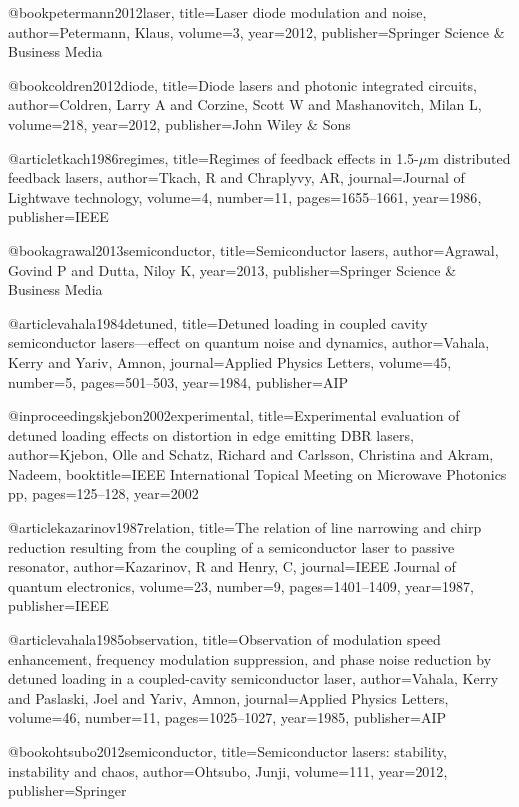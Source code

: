 @book{petermann2012laser,
  title={Laser diode modulation and noise},
  author={Petermann, Klaus},
  volume={3},
  year={2012},
  publisher={Springer Science \& Business Media}
}

@book{coldren2012diode,
  title={Diode lasers and photonic integrated circuits},
  author={Coldren, Larry A and Corzine, Scott W and Mashanovitch, Milan L},
  volume={218},
  year={2012},
  publisher={John Wiley \& Sons}
}

@article{tkach1986regimes,
  title={Regimes of feedback effects in 1.5-$\mu$m distributed feedback lasers},
  author={Tkach, R and Chraplyvy, AR},
  journal={Journal of Lightwave technology},
  volume={4},
  number={11},
  pages={1655--1661},
  year={1986},
  publisher={IEEE}
}


@book{agrawal2013semiconductor,
  title={Semiconductor lasers},
  author={Agrawal, Govind P and Dutta, Niloy K},
  year={2013},
  publisher={Springer Science \& Business Media}
}

@article{vahala1984detuned,
  title={Detuned loading in coupled cavity semiconductor lasers—effect on quantum noise and dynamics},
  author={Vahala, Kerry and Yariv, Amnon},
  journal={Applied Physics Letters},
  volume={45},
  number={5},
  pages={501--503},
  year={1984},
  publisher={AIP}
}

@inproceedings{kjebon2002experimental,
  title={Experimental evaluation of detuned loading effects on distortion in edge emitting DBR lasers},
  author={Kjebon, Olle and Schatz, Richard and Carlsson, Christina and Akram, Nadeem},
  booktitle={IEEE International Topical Meeting on Microwave Photonics pp},
  pages={125--128},
  year={2002}
}

@article{kazarinov1987relation,
  title={The relation of line narrowing and chirp reduction resulting from the coupling of a semiconductor laser to passive resonator},
  author={Kazarinov, R and Henry, C},
  journal={IEEE Journal of quantum electronics},
  volume={23},
  number={9},
  pages={1401--1409},
  year={1987},
  publisher={IEEE}
}

@article{vahala1985observation,
  title={Observation of modulation speed enhancement, frequency modulation suppression, and phase noise reduction by detuned loading in a coupled-cavity semiconductor laser},
  author={Vahala, Kerry and Paslaski, Joel and Yariv, Amnon},
  journal={Applied Physics Letters},
  volume={46},
  number={11},
  pages={1025--1027},
  year={1985},
  publisher={AIP}
}

@book{ohtsubo2012semiconductor,
  title={Semiconductor lasers: stability, instability and chaos},
  author={Ohtsubo, Junji},
  volume={111},
  year={2012},
  publisher={Springer}
}

